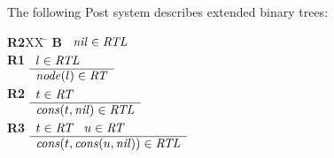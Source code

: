 \documentclass[addpoints]{exam}
\begin{document}
\begin{questions}
\clearpage
\question The following Post system describes extended binary trees:

\begin{tabbing}
{\bf R2}XX \=  \kill
{\bf B} \>
        \(\begin{array}[t]{l}
        \mbox{\it nil\/}\in\mbox{\it RTL\/}
        \end{array}\) \\[2ex]
{\bf R1} \>
        \(\begin{array}[t]{l}
        l\in\mbox{\it RTL\/} \\
        \hline
        \mbox{\it node\/}(l)\in\mbox{\it RT\/}
        \end{array}\)\\[2ex]
{\bf R2} \>
        \(\begin{array}[t]{l}
        t\in\mbox{\it RT\/}\\
        \hline
        \mbox{\it cons\/}(t,\mbox{\it nil\/})\in\mbox{\it RTL\/}
        \end{array}\) \\[2ex]
{\bf R3} \>
        \(\begin{array}[t]{l}
        t\in\mbox{\it RT\/}\;\;\;u\in\mbox{\it RT\/} \\
        \hline
        \mbox{\it cons\/}(t,\mbox{\it cons\/}(u,\mbox{\it nil\/}))\in\mbox{\it RTL\/}
        \end{array}\) 
\end{tabbing}

\begin{parts}

\end{parts}
\end{questions}
\end{document}

